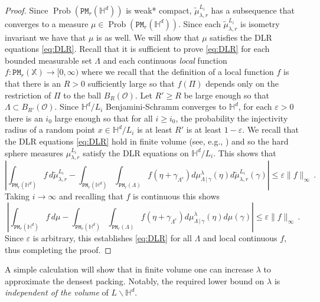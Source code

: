 \documentclass[11pt]{amsart}
\theoremstyle{definition}
\theoremstyle{remark}
\renewcommand{\H}{\mathbb{H}}
\newcommand{\bX}{\mathbb{X}}
\newcommand{\cO}{\mathcal{O}}
\newcommand{\cP}{\mathtt{PM}}
\newcommand{\Prob}{\operatorname{Prob}}
\newcommand{\eps}{\varepsilon}
\begin{document}
\begin{proof}
    Since $\Prob(\cP_r(\H^d))$ is weak* compact, $\tilde{\mu}^{L_i}_{\lambda,r}$ has a subsequence that converges to a measure $\mu \in \Prob(\cP_r(\H^d))$.  Since each $\tilde{\mu}^{L_i}_{\lambda,r}$ is isometry invariant we have that $\mu$ is as well.  We will show that $\mu$ satisfies the DLR equations \eqref{eq:DLR}.  Recall that it is sufficient to prove \eqref{eq:DLR} for each bounded measurable set $\Lambda$ and each continuous \emph{local} function $f: \cP_r(\bX) \to [0,\infty)$ where we recall that the definition of a local function $f$ is that there is an $R > 0$ sufficiently large so that  $f(\Pi)$ depends only on the restriction of $\Pi$ to the ball $B_R(\cO)$. Let $R' \geq R$ be large enough so that $\Lambda \subset B_{R'}(\cO)$.  Since $\H^d / L_i$ Benjamini-Schramm converges to $\H^d$, for each $\eps > 0$ there is an $i_0$ large enough so that for all $i \geq i_0$, the probability the injectivity radius of a random point $x \in \H^d / L_i$ is at least $R'$ is at least $1 - \eps$.  We recall that the DLR equations \eqref{eq:DLR} hold in finite volume (see, e.g., \cite[eq. (5.4)]{jansen2018gibbsian}) and so the hard sphere measures  $\mu_{\lambda,r}^{L_i}$ satisfy the DLR equations on $\H^d/ L_i$.  This shows that \begin{equation*}
        \left|\int_{\cP_r(\H^d)} f \,d\tilde{\mu}_{\lambda,r}^{L_i} - \int_{\cP_r(\H^d)} \int_{\cP_r(\Lambda)} f(\eta + \gamma_{\Lambda^c}) d\mu_{\Lambda\,|\,\gamma}^\lambda(\eta) d\tilde{\mu}_{\lambda,r}^{L_i}(\gamma) \right| \leq \eps \|f\|_\infty\,.
    \end{equation*}
    Taking $i \to \infty$ and recalling that $f$ is continuous this shows \begin{equation*}
        \left|\int_{\cP_r(\H^d)} f \,d\mu - \int_{\cP_r(\H^d)} \int_{\cP_r(\Lambda)} f(\eta + \gamma_{\Lambda^c}) d\mu_{\Lambda\,|\,\gamma}^\lambda(\eta) d\mu(\gamma) \right| \leq \eps \|f\|_\infty\,.
    \end{equation*}
    Since $\eps$ is arbitrary, this establishes \eqref{eq:DLR} for all $\Lambda$ and local continuous $f$, thus completing the proof.
\end{proof}


A simple calculation will show that in finite volume one can increase $\lambda$ to approximate the densest packing.  Notably, the required lower bound on $\lambda$ is \emph{independent of the volume} of $L \backslash \H^d.$
\end{document}
